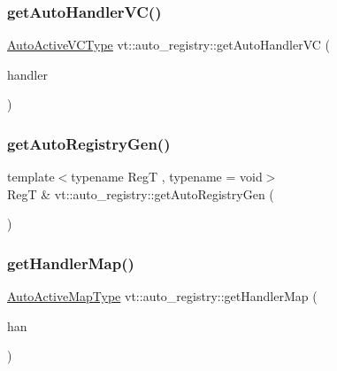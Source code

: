 \subsubsection{\texorpdfstring{get\+Auto\+Handler\+V\+C()}{getAutoHandlerVC()}}
{\footnotesize\ttfamily \hyperlink{namespacevt_1_1auto__registry_a4a96fdbb11b7be748365fcfc6fc46862}{Auto\+Active\+V\+C\+Type} vt\+::auto\+\_\+registry\+::get\+Auto\+Handler\+VC (\begin{DoxyParamCaption}\item[{\hyperlink{namespacevt_af64846b57dfcaf104da3ef6967917573}{Handler\+Type} const \&}]{handler }\end{DoxyParamCaption})\hspace{0.3cm}{\ttfamily [inline]}}

\mbox{\label{namespacevt_1_1auto__registry_ab2ee3a933397aba4f50be12646be5fa7}} 
\subsubsection{\texorpdfstring{get\+Auto\+Registry\+Gen()}{getAutoRegistryGen()}}
{\footnotesize\ttfamily template$<$typename RegT , typename  = void$>$ \\
RegT \& vt\+::auto\+\_\+registry\+::get\+Auto\+Registry\+Gen (\begin{DoxyParamCaption}{ }\end{DoxyParamCaption})\hspace{0.3cm}{\ttfamily [inline]}}

\mbox{\label{namespacevt_1_1auto__registry_afd33d520084dd18da74f96012ca084b0}} 
\subsubsection{\texorpdfstring{get\+Handler\+Map()}{getHandlerMap()}}
{\footnotesize\ttfamily \hyperlink{namespacevt_1_1auto__registry_a03898a246ff1a8ce8ee4071a0391b386}{Auto\+Active\+Map\+Type} vt\+::auto\+\_\+registry\+::get\+Handler\+Map (\begin{DoxyParamCaption}\item[{\hyperlink{namespacevt_af64846b57dfcaf104da3ef6967917573}{Handler\+Type} const \&}]{han }\end{DoxyParamCaption})\hspace{0.3cm}{\ttfamily [inline]}}

